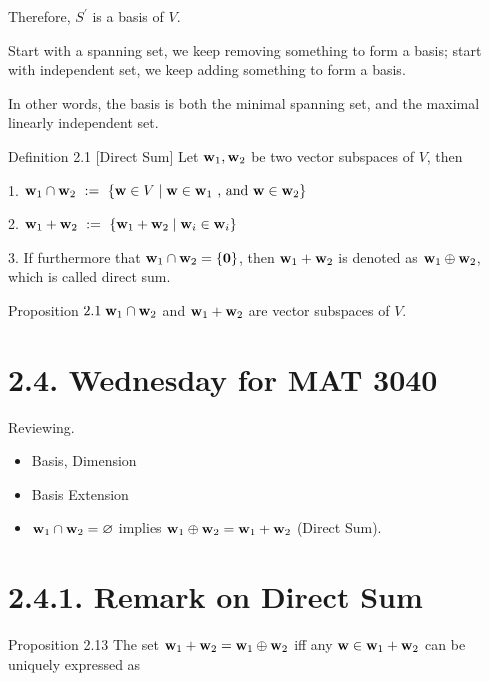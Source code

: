\documentclass[11pt]{article}
\begin{document}
Therefore, \({S}^{\prime }\) is a basis of \(V\).

Start with a spanning set, we keep removing something to form a basis; start with independent set, we keep adding something to form a basis.

In other words, the basis is both the minimal spanning set, and the maximal linearly independent set.

Definition 2.1 [Direct Sum] Let \({\bf w}_1,{\bf w}_2\) be two vector subspaces of \(V\), then

1. \({\bf w}_1 \cap  {\bf w}_2 \mathrel{\text{ := }} \left\{  {\mathbf{w} \in  V \mid  \mathbf{w} \in  {\bf w}_1\text{ , and }\mathbf{w} \in  {\bf w}_2}\right\}\)

2. \({\bf w}_1 + {\bf w}_2 \mathrel{\text{ := }} \left\{  {{\bf w}_1 + {\bf w}_2 \mid  {\bf w}_{i} \in  {\bf w}_{i}}\right\}\)

3. If furthermore that \({\bf w}_1 \cap  {\bf w}_2 = \{ \mathbf{0}\}\), then \({\bf w}_1 + {\bf w}_2\) is denoted as \({\bf w}_1 \oplus  {\bf w}_2\), which is called direct sum.

Proposition \({2.1}\;{\bf w}_1 \cap  {\bf w}_2\) and \({\bf w}_1 + {\bf w}_2\) are vector subspaces of \(V\).

\section*{2.4. Wednesday for MAT 3040}

Reviewing.

\begin{itemize}
\item Basis, Dimension
\end{itemize}

\begin{itemize}
\item Basis Extension
\end{itemize}

\begin{itemize}
\item \({\bf w}_1 \cap  {\bf w}_2 = \varnothing\) implies \({\bf w}_1 \oplus  {\bf w}_2 = {\bf w}_1 + {\bf w}_2\) (Direct Sum).
\end{itemize}

\section*{2.4.1. Remark on Direct Sum}

Proposition 2.13 The set \({\bf w}_1 + {\bf w}_2 = {\bf w}_1 \oplus  {\bf w}_2\) iff any \(\mathbf{w} \in  {\bf w}_1 + {\bf w}_2\) can be uniquely expressed as
\end{document}

